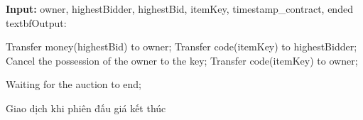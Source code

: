 \documentclass[a4paper]{article}
\begin{document}
\begin{algorithm}
 \textbf{Input:} owner, highestBidder, highestBid, itemKey, timestamp\_contract, ended\\
 textbf{Output:}\\
 
    {
        {
            \State Transfer money(highestBid) to owner;
            \State Transfer code(itemKey) to highestBidder;
            \State Cancel the possession of the owner to the key;
        }
        \Else
        {
            \State Transfer code(itemKey) to owner;
        }
        
    }
    \Else
    {
        \State Waiting for the auction to end;
    }
    
 \caption{Giao dịch khi phiên đấu giá kết thúc}
\end{algorithm}

\newpage
\end{document}
